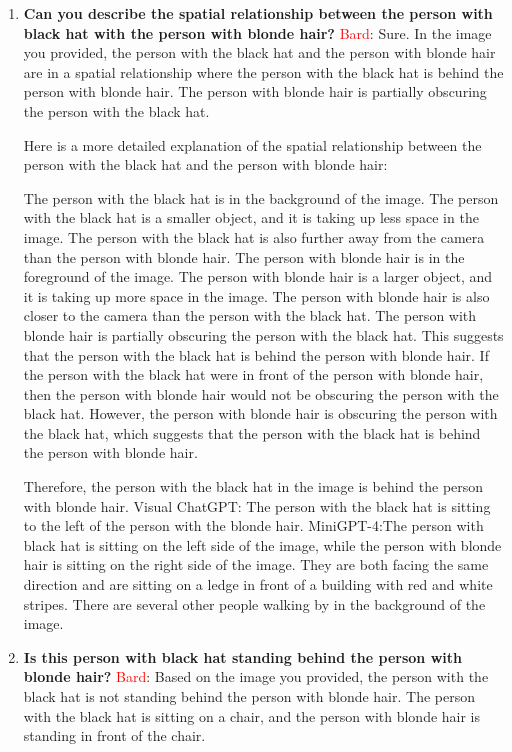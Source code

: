 \begin{enumerate}
    \item \textbf{Can you describe the spatial relationship between the person with black hat with the person with blonde hair?}
    \subitem \textcolor{Red}{Bard}: 
    Sure. In the image you provided, the person with the black hat and the person with blonde hair are in a spatial relationship where the person with the black hat is behind the person with blonde hair. The person with blonde hair is partially obscuring the person with the black hat.
    
    Here is a more detailed explanation of the spatial relationship between the person with the black hat and the person with blonde hair:
    
    The person with the black hat is in the background of the image. The person with the black hat is a smaller object, and it is taking up less space in the image. The person with the black hat is also further away from the camera than the person with blonde hair.
    The person with blonde hair is in the foreground of the image. The person with blonde hair is a larger object, and it is taking up more space in the image. The person with blonde hair is also closer to the camera than the person with the black hat.
    The person with blonde hair is partially obscuring the person with the black hat. This suggests that the person with the black hat is behind the person with blonde hair.
    If the person with the black hat were in front of the person with blonde hair, then the person with blonde hair would not be obscuring the person with the black hat. However, the person with blonde hair is obscuring the person with the black hat, which suggests that the person with the black hat is behind the person with blonde hair.
    
    Therefore, the person with the black hat in the image is behind the person with blonde hair.     
    \subitem Visual ChatGPT: The person with the black hat is sitting to the left of the person with the blonde hair.
    \subitem MiniGPT-4:The person with black hat is sitting on the left side of the image, while the person with blonde hair is sitting on the right side of the image. They are both facing the same direction and are sitting on a ledge in front of a building with red and white stripes. There are several other people walking by in the background of the image. 
    \item \textbf{Is this person with black hat standing behind the person with blonde hair?}
    \subitem \textcolor{Red}{Bard}: 
    Based on the image you provided, the person with the black hat is not standing behind the person with blonde hair. The person with the black hat is sitting on a chair, and the person with blonde hair is standing in front of the chair.
    

\end{enumerate}
